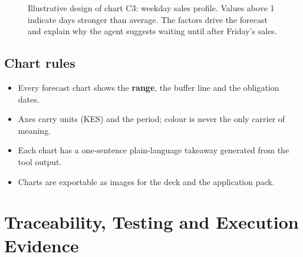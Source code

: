 \documentclass[10pt,a4paper]{article}
\begin{document}
\begin{figure}[!htbp]
\centering
{}
\caption{Illustrative design of chart C3: weekday sales profile. Values above 1 indicate days stronger than average. The factors drive the forecast and explain why the agent suggests waiting until after Friday's sales.}
\label{fig:wd}
\end{figure}

\subsection{Chart rules}
\begin{itemize}
  \item Every forecast chart shows the \textbf{range}, the buffer line and the obligation dates.
  \item Axes carry units (KES) and the period; colour is never the only carrier of meaning.
  \item Each chart has a one-sentence plain-language takeaway generated from the tool output.
  \item Charts are exportable as images for the deck and the application pack.
\end{itemize}

\section{Traceability, Testing and Execution Evidence}
\end{document}
